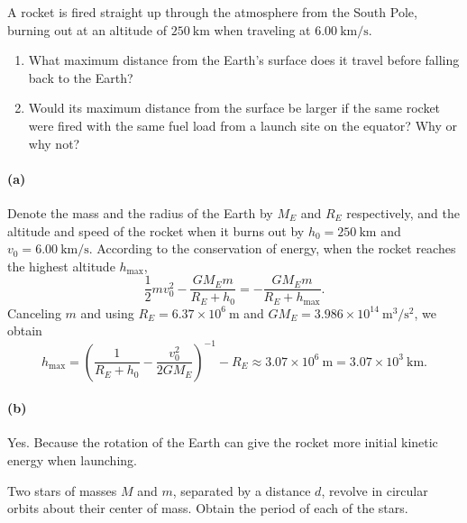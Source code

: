 \documentclass{article}
\begin{document}
\begin{problem}
A rocket is fired straight up through the atmosphere from the South Pole, burning out at an altitude of $250\ \mathrm{km}$ when traveling at $6.00\ \mathrm{km/s}$.
\begin{enumerate}
  \item[(a)] What maximum distance from the Earth's surface does it travel before falling back to the Earth?
  \item[(b)] Would its maximum distance from the surface be larger if the same rocket were fired with the same fuel load from a launch site on the equator? Why or why not?
\end{enumerate}
\end{problem}

\begin{solution}
	\paragraph{(a)} Denote the mass and the radius of the Earth by $M_E$ and $R_E$ respectively, and the altitude and speed of the rocket when it burns out by $h_0 = 250\ \mathrm{km}$ and $v_0 = 6.00\ \mathrm{km/s}$. According to the conservation of energy, when the rocket reaches the highest altitude $h_{\mathrm{max}}$,
	\[ \frac{1}{2}m v_0^2 - \frac{GM_E m}{R_E + h_0} = -\frac{GM_E m}{R_E + h_{\mathrm{max}}}. \]
	Canceling $m$ and using $R_E = 6.37\times 10^6\ \mathrm{m}$ and $GM_E = 3.986\times 10^{14}\ \mathrm{m^3/s^2}$, we obtain
	\[ h_{\mathrm{max}} = \left(\frac{1}{R_E+h_0}-\frac{v_0^2}{2GM_E}\right)^{-1}-R_E
	\approx 3.07\times 10^6\ \mathrm{m} = 3.07\times 10^3\ \mathrm{km}. \]

	\paragraph{(b)} Yes. Because the rotation of the Earth can give the rocket more initial kinetic energy when launching.
\end{solution}



\begin{problem}
Two stars of masses $M$ and $m$, separated by a distance $d$, revolve in circular orbits about their center of mass. Obtain the period of each of the stars.
\begin{center}
  
\end{center}
\end{problem}
\end{document}
